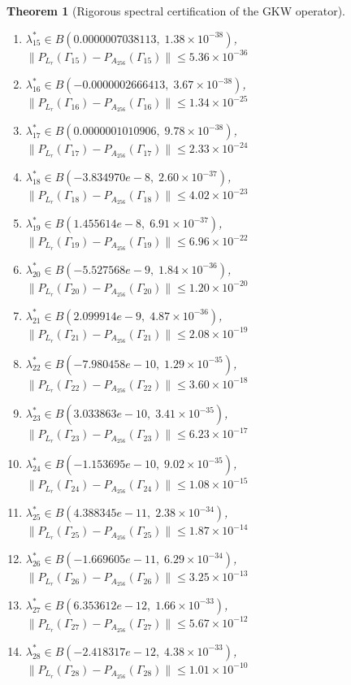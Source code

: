 \documentclass[11pt]{article}
\newtheorem{theorem}{Theorem}
\begin{document}
\begin{theorem}[Rigorous spectral certification of the GKW operator]
\begin{enumerate}
\item $\lambda_{15}^* \in B(0.0000007038113,\; 1.38 \times 10^{-38})$, \quad $\|P_{L_r}(\Gamma_{15}) - P_{A_{256}}(\Gamma_{15})\| \leq 5.36 \times 10^{-36}$
\item $\lambda_{16}^* \in B(-0.0000002666413,\; 3.67 \times 10^{-38})$, \quad $\|P_{L_r}(\Gamma_{16}) - P_{A_{256}}(\Gamma_{16})\| \leq 1.34 \times 10^{-25}$
\item $\lambda_{17}^* \in B(0.0000001010906,\; 9.78 \times 10^{-38})$, \quad $\|P_{L_r}(\Gamma_{17}) - P_{A_{256}}(\Gamma_{17})\| \leq 2.33 \times 10^{-24}$
\item $\lambda_{18}^* \in B(-3.834970e-8,\; 2.60 \times 10^{-37})$, \quad $\|P_{L_r}(\Gamma_{18}) - P_{A_{256}}(\Gamma_{18})\| \leq 4.02 \times 10^{-23}$
\item $\lambda_{19}^* \in B(1.455614e-8,\; 6.91 \times 10^{-37})$, \quad $\|P_{L_r}(\Gamma_{19}) - P_{A_{256}}(\Gamma_{19})\| \leq 6.96 \times 10^{-22}$
\item $\lambda_{20}^* \in B(-5.527568e-9,\; 1.84 \times 10^{-36})$, \quad $\|P_{L_r}(\Gamma_{20}) - P_{A_{256}}(\Gamma_{20})\| \leq 1.20 \times 10^{-20}$
\item $\lambda_{21}^* \in B(2.099914e-9,\; 4.87 \times 10^{-36})$, \quad $\|P_{L_r}(\Gamma_{21}) - P_{A_{256}}(\Gamma_{21})\| \leq 2.08 \times 10^{-19}$
\item $\lambda_{22}^* \in B(-7.980458e-10,\; 1.29 \times 10^{-35})$, \quad $\|P_{L_r}(\Gamma_{22}) - P_{A_{256}}(\Gamma_{22})\| \leq 3.60 \times 10^{-18}$
\item $\lambda_{23}^* \in B(3.033863e-10,\; 3.41 \times 10^{-35})$, \quad $\|P_{L_r}(\Gamma_{23}) - P_{A_{256}}(\Gamma_{23})\| \leq 6.23 \times 10^{-17}$
\item $\lambda_{24}^* \in B(-1.153695e-10,\; 9.02 \times 10^{-35})$, \quad $\|P_{L_r}(\Gamma_{24}) - P_{A_{256}}(\Gamma_{24})\| \leq 1.08 \times 10^{-15}$
\item $\lambda_{25}^* \in B(4.388345e-11,\; 2.38 \times 10^{-34})$, \quad $\|P_{L_r}(\Gamma_{25}) - P_{A_{256}}(\Gamma_{25})\| \leq 1.87 \times 10^{-14}$
\item $\lambda_{26}^* \in B(-1.669605e-11,\; 6.29 \times 10^{-34})$, \quad $\|P_{L_r}(\Gamma_{26}) - P_{A_{256}}(\Gamma_{26})\| \leq 3.25 \times 10^{-13}$
\item $\lambda_{27}^* \in B(6.353612e-12,\; 1.66 \times 10^{-33})$, \quad $\|P_{L_r}(\Gamma_{27}) - P_{A_{256}}(\Gamma_{27})\| \leq 5.67 \times 10^{-12}$
\item $\lambda_{28}^* \in B(-2.418317e-12,\; 4.38 \times 10^{-33})$, \quad $\|P_{L_r}(\Gamma_{28}) - P_{A_{256}}(\Gamma_{28})\| \leq 1.01 \times 10^{-10}$

\end{enumerate}
\end{theorem}
\end{document}
